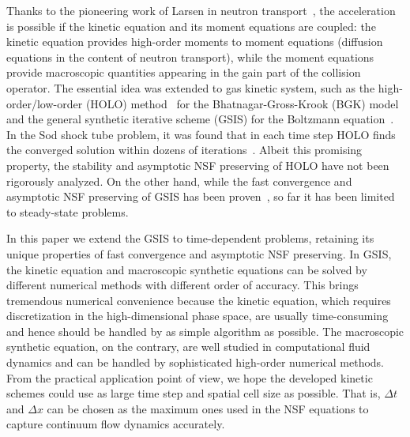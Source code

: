 \documentclass[onefignum,onetabnum]{siamart171218}
\newcommand{\leir}[1]{{\leavevmode\color{red}#1}}
\begin{document}
Thanks to the pioneering work of Larsen in neutron transport~\cite{Larsen1983NSE}, the acceleration is possible if the kinetic equation and its moment equations are coupled: the kinetic equation provides high-order moments to moment equations (diffusion equations in the content of neutron transport), while the moment equations provide macroscopic quantities appearing in the gain part of the collision operator. 
The essential idea was extended to gas kinetic system, such as the high-order/low-order (HOLO) method~\cite{Taitano2014} for the Bhatnagar-Gross-Krook (BGK) model~\cite{Bhatnagar1954} and the general synthetic iterative scheme (GSIS) for the Boltzmann equation~\cite{SuArXiv2019}. In the Sod shock tube problem, it was found that in each time step HOLO finds the converged solution within dozens of iterations~\cite{Taitano2014}. Albeit this promising property, the stability and asymptotic NSF preserving of HOLO have not been rigorously analyzed. On the other hand, while the fast convergence and asymptotic NSF preserving of GSIS has been proven~\cite{Su2020SIAM,Su2021CMAME,Zhu2021JCP}, so far it has been limited to steady-state problems.



In this paper we extend the GSIS to time-dependent problems, retaining its unique properties of fast convergence and asymptotic NSF preserving.
In GSIS, the kinetic equation and macroscopic synthetic equations can be solved by different numerical methods with different order of accuracy. This brings tremendous numerical convenience because the kinetic equation, which requires discretization in the high-dimensional phase space, are usually time-consuming and hence should be handled by as simple algorithm as possible. The macroscopic synthetic equation, on the contrary, are well studied in computational fluid dynamics and can be handled by sophisticated high-order numerical methods.   
From the practical application point of view, we hope the developed kinetic schemes could use as large time step and spatial cell size as possible. That is, $\Delta{t}$ and $\Delta{x}$ can be chosen as the maximum ones used in the NSF equations to capture continuum flow dynamics accurately. 
\end{document}
